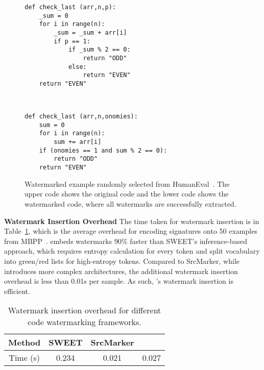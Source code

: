 \begin{figure}[!ht]
    \centering
    \vspace{-20pt}
    \begin{minipage}{0.4\textwidth}
\centering
 \begin{lstlisting}[basicstyle=\ttfamily\tiny,label=lst:original,caption=Original code]
def check_last (arr,n,p):
    _sum = 0
    for i in range(n): 
        _sum = _sum + arr[i] 
        if p == 1: 
            if _sum % 2 == 0: 
                return "ODD"
            else: 
                return "EVEN"
    return "EVEN"
\end{lstlisting}
    \end{minipage}
\\
    \begin{minipage}{0.4\textwidth}
    \vspace{-10pt}
        \centering
        \begin{lstlisting}[basicstyle=\ttfamily\tiny,label=lst:wm,caption=Watermarked code]
def check_last (arr,n,onomies):     
    sum = 0
    for i in range(n): 
        sum += arr[i] 
    if (onomies == 1 and sum % 2 == 0): 
        return "ODD"
    return "EVEN"
        \end{lstlisting}
    \end{minipage}
    \vspace{-5pt}
    \caption{Watermarked example randomly selected from HumanEval~\cite{chen2021codex}. The upper code shows the original code and the lower code shows the watermarked code, where all watermarks are successfully extracted.}
    \vspace{-10pt}
    \label{tab:example}
\end{figure}

\textbf{Watermark Insertion Overhead} The time taken for watermark insertion is in Table~\ref{tab:overhead}, which is the average overhead for encoding signatures onto 50 examples from MBPP~\cite{austin2021program}. \sys{} embeds watermarks 90\% faster than SWEET's inference-based approach, which requires entropy calculation for every token and split vocabulary into green/red lists for high-entropy tokens. Compared to SrcMarker, while \sys{} introduces more complex architectures, the additional watermark insertion overhead is less than 0.01s per sample. As such, \sys's watermark insertion is efficient. 

\begin{table}[!ht]
    \centering
    \small
    \begin{tabular}{c|ccc}
    \toprule
       Method  & SWEET & SrcMarker & \sys{} \\\hline
       Time (s)  & 0.234 & 0.021 & 0.027 \\
    \bottomrule
    \end{tabular}
    \vspace{-5pt}
    \caption{Watermark insertion overhead for different code watermarking frameworks.}
    \vspace{-5pt}
    \label{tab:overhead}
\end{table} 